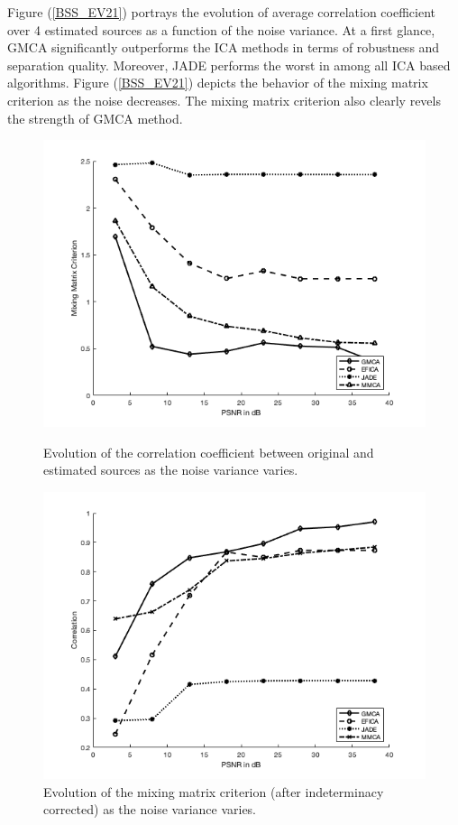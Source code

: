 
Figure (\ref{BSS_EV21}) portrays the evolution of average correlation coefficient over 4 estimated sources as a function of the noise variance. At a first glance, GMCA significantly outperforms the ICA methods in terms of robustness and separation quality. Moreover, JADE performs the worst in among all ICA based algorithms. Figure (\ref{BSS_EV21}) depicts the behavior of the mixing matrix criterion as the noise decreases. The mixing matrix criterion also clearly revels the strength of GMCA method.\\

\begin{figure}[!htbp]
\centering
\begin{minipage}[b]{0.49\textwidth}
\includegraphics[width=\textwidth]{images/image_separation1.png}
\caption{Evolution of the correlation coefficient between original and estimated sources as the noise variance varies.}
\label{BSS_EV21}
\end{minipage}
\begin{minipage}[b]{0.49\textwidth}
\includegraphics[width=\textwidth]{images/image_separation2.png}
\caption{Evolution of the mixing matrix criterion (after indeterminacy corrected) as the noise variance varies.}
\label{BSS_EV22}
\end{minipage}
\end{figure}

